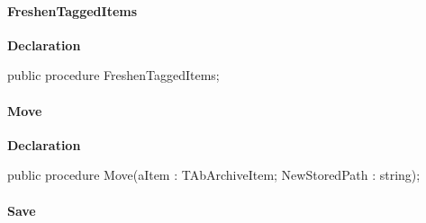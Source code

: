 \documentclass{report}
\newif\ifpdf
\begin{document}
\paragraph*{FreshenTaggedItems}\hspace*{\fill}

\label{AbZipper.TAbCustomZipper-FreshenTaggedItems}
\begin{list}{}{
\setlength{\itemindent}{0cm}
\setlength{\listparindent}{0cm}
\setlength{\leftmargin}{\evensidemargin}
\addtolength{\leftmargin}{\tmplength}
\settowidth{\labelsep}{X}
\addtolength{\leftmargin}{\labelsep}
\setlength{\labelwidth}{\tmplength}
}
\item[\textbf{Declaration}\hfill]
\ifpdf
\begin{flushleft}
\fi
\begin{ttfamily}
public procedure FreshenTaggedItems;\end{ttfamily}

\ifpdf
\end{flushleft}
\fi

\end{list}
\paragraph*{Move}\hspace*{\fill}

\label{AbZipper.TAbCustomZipper-Move}
\begin{list}{}{
\setlength{\itemindent}{0cm}
\setlength{\listparindent}{0cm}
\setlength{\leftmargin}{\evensidemargin}
\addtolength{\leftmargin}{\tmplength}
\settowidth{\labelsep}{X}
\addtolength{\leftmargin}{\labelsep}
\setlength{\labelwidth}{\tmplength}
}
\item[\textbf{Declaration}\hfill]
\ifpdf
\begin{flushleft}
\fi
\begin{ttfamily}
public procedure Move(aItem : TAbArchiveItem; NewStoredPath : string);\end{ttfamily}

\ifpdf
\end{flushleft}
\fi

\end{list}
\paragraph*{Save}\hspace*{\fill}
\end{document}
